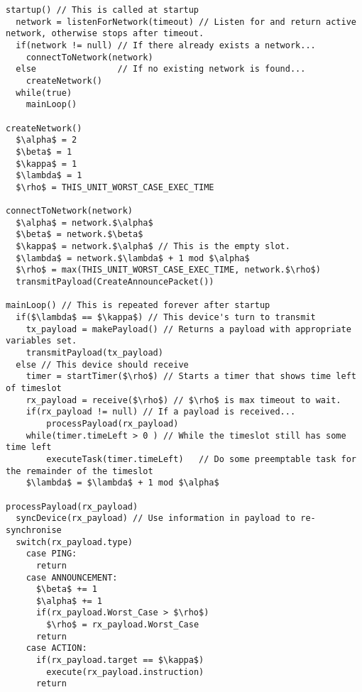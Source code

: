 \begin{lstlisting}[style=customc,mathescape=true]
startup() // This is called at startup
  network = listenForNetwork(timeout) // Listen for and return active network, otherwise stops after timeout.
  if(network != null) // If there already exists a network...
    connectToNetwork(network)
  else                // If no existing network is found...
    createNetwork()
  while(true)
    mainLoop()
  
createNetwork()
  $\alpha$ = 2
  $\beta$ = 1
  $\kappa$ = 1
  $\lambda$ = 1
  $\rho$ = THIS_UNIT_WORST_CASE_EXEC_TIME
  
connectToNetwork(network)
  $\alpha$ = network.$\alpha$
  $\beta$ = network.$\beta$
  $\kappa$ = network.$\alpha$ // This is the empty slot.
  $\lambda$ = network.$\lambda$ + 1 mod $\alpha$
  $\rho$ = max(THIS_UNIT_WORST_CASE_EXEC_TIME, network.$\rho$)
  transmitPayload(CreateAnnouncePacket())

mainLoop() // This is repeated forever after startup
  if($\lambda$ == $\kappa$) // This device's turn to transmit
  	tx_payload = makePayload() // Returns a payload with appropriate variables set.
  	transmitPayload(tx_payload)
  else // This device should receive
  	timer = startTimer($\rho$) // Starts a timer that shows time left of timeslot
  	rx_payload = receive($\rho$) // $\rho$ is max timeout to wait. 
  	if(rx_payload != null) // If a payload is received...
  	    processPayload(rx_payload)
  	while(timer.timeLeft > 0 ) // While the timeslot still has some time left
  	    executeTask(timer.timeLeft)   // Do some preemptable task for the remainder of the timeslot
  	$\lambda$ = $\lambda$ + 1 mod $\alpha$

processPayload(rx_payload)
  syncDevice(rx_payload) // Use information in payload to re-synchronise
  switch(rx_payload.type)
    case PING:
      return
    case ANNOUNCEMENT:
      $\beta$ += 1
      $\alpha$ += 1
      if(rx_payload.Worst_Case > $\rho$)
        $\rho$ = rx_payload.Worst_Case
      return
    case ACTION:
      if(rx_payload.target == $\kappa$)
        execute(rx_payload.instruction)
      return
\end{lstlisting}